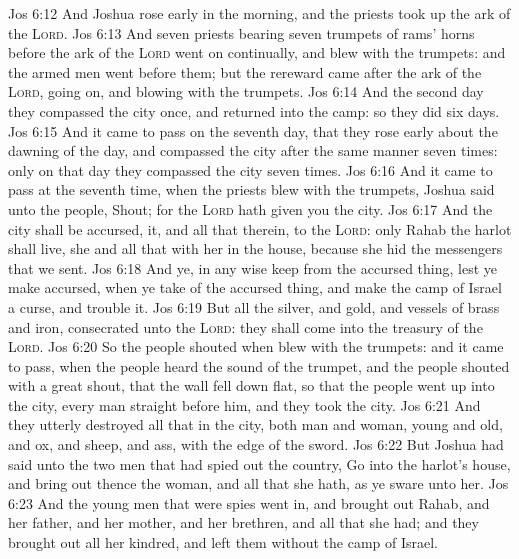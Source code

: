 \vs Jos 6:12 And Joshua rose early in the morning, and the priests took up the ark of the \textsc{Lord}.
\vs Jos 6:13 And seven priests bearing seven trumpets of rams' horns before the ark of the \textsc{Lord} went on continually, and blew with the trumpets: and the armed men went before them; but the rereward came after the ark of the \textsc{Lord},  going on, and blowing with the trumpets.
\vs Jos 6:14 And the second day they compassed the city once, and returned into the camp: so they did six days.
\vs Jos 6:15 And it came to pass on the seventh day, that they rose early about the dawning of the day, and compassed the city after the same manner seven times: only on that day they compassed the city seven times.
\vs Jos 6:16 And it came to pass at the seventh time, when the priests blew with the trumpets, Joshua said unto the people, Shout; for the \textsc{Lord} hath given you the city.
\vs Jos 6:17 And the city shall be accursed,  it, and all that  therein, to the \textsc{Lord}: only Rahab the harlot shall live, she and all that  with her in the house, because she hid the messengers that we sent.
\vs Jos 6:18 And ye, in any wise keep  from the accursed thing, lest ye make  accursed, when ye take of the accursed thing, and make the camp of Israel a curse, and trouble it.
\vs Jos 6:19 But all the silver, and gold, and vessels of brass and iron,  consecrated unto the \textsc{Lord}: they shall come into the treasury of the \textsc{Lord}.
\vs Jos 6:20 So the people shouted when  blew with the trumpets: and it came to pass, when the people heard the sound of the trumpet, and the people shouted with a great shout, that the wall fell down flat, so that the people went up into the city, every man straight before him, and they took the city.
\vs Jos 6:21 And they utterly destroyed all that  in the city, both man and woman, young and old, and ox, and sheep, and ass, with the edge of the sword.
\vs Jos 6:22 But Joshua had said unto the two men that had spied out the country, Go into the harlot's house, and bring out thence the woman, and all that she hath, as ye sware unto her.
\vs Jos 6:23 And the young men that were spies went in, and brought out Rahab, and her father, and her mother, and her brethren, and all that she had; and they brought out all her kindred, and left them without the camp of Israel.
